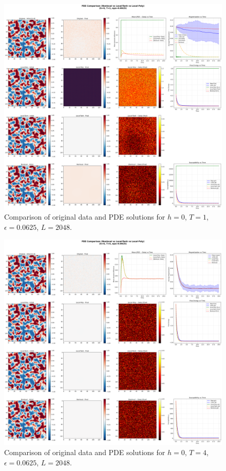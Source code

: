\documentclass[11pt,a4paper]{article}
\begin{document}

\begin{figure}[!h]
    \centering
    \includegraphics[width=1.0\textwidth]{fig/compare_pde_solvers_L2048_h0_T1_eps0.0625.png}
    \caption{Comparison of original data and PDE solutions for $h=0$, $T=1$, $\epsilon=0.0625$, $L=2048$.}
    \label{fig:pde_comparison_h0_T1_eps0.0625_L2048}
\end{figure}


\begin{figure}[!h]
    \centering
    \includegraphics[width=1.0\textwidth]{fig/compare_pde_solvers_L2048_h0_T4_eps0.0625.png}
    \caption{Comparison of original data and PDE solutions for $h=0$, $T=4$, $\epsilon=0.0625$, $L=2048$.}
    \label{fig:pde_comparison_h0_T4_eps0.0625_L2048}
\end{figure}
\end{document}
